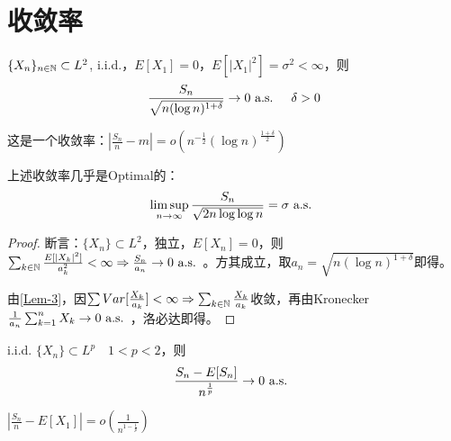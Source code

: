 \documentclass{ctexart}
\begin{document}
\section{收敛率}
\begin{Prop}
  $\{X_{n}\}_{n\in\mathbb{N}}\subset L^{2}$, i.i.d.，$E[X_{1}]=0$，$E[|X_{1}|^{2}]=\sigma^{2}<\infty$，则
  \[\frac{S_{n}}{\sqrt{n(\log n)^{1+\delta}}}\to 0\text{ a.s. }\quad \delta>0\]
\end{Prop}

\begin{Rmk}
  这是一个收敛率：$|\frac{S_{n}}{n}-m|=o(n^{-\frac 1 2}(\log n)^{\frac{1+\delta}{2}})$
\end{Rmk}

\begin{Rmk}
  上述收敛率几乎是Optimal的：
  \[\limsup_{n\to\infty}\frac{S_{n}}{\sqrt{2n\log\log n}}=\sigma \text{ a.s. }\]
\end{Rmk}

\begin{proof}
  断言：$\{X_{n}\}\subset L^{2}$，独立，$E[X_{n}]=0$，则$\sum_{k\in \mathbb{N}}\frac{E[|X_{k}|^{2}]}{a_{k}^{2}}<\infty\Rightarrow \frac{S_{n}}{a_{n}}\to 0\text{ a.s. }$。方其成立，取$a_{n}=\sqrt{n(\log n)^{1+\delta}}$即得。

  由\ref{Lem-3}，因$\sum Var[\frac{X_{k}}{a_{k}}]<\infty\Rightarrow \sum_{k\in\mathbb{N}}\frac{X_{k}}{a_{k}}$收敛，再由Kronecker $\frac{1}{a_{n}}\sum_{k=1}^{n}X_{k}\to 0\text{ a.s. }$，洛必达即得。
\end{proof}

\begin{Prop}
  i.i.d. $\{X_{n}\}\subset L^{p}\quad 1<p<2$，则
  \[\frac{S_{n}-E[S_{n}]}{n^{\frac 1 p}}\to 0\text{ a.s. }\]
\end{Prop}

\begin{Rmk}
  $|\frac{S_{n}}{n}-E[X_{1}]|=o(\frac{1}{n^{1-\frac{1}{p}}})$
\end{Rmk}
\end{document}
